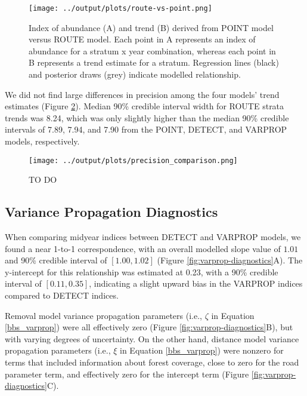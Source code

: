 \documentclass[12pt]{article}
\begin{document}
\begin{figure}[h]
	\texttt{[image: ../output/plots/route-vs-point.png]}
	\caption{Index of abundance (A) and trend (B) derived from POINT model versus ROUTE model. Each point in A represents an index of abundance for a stratum x year combination, whereas each point in B represents a trend estimate for a stratum. Regression lines (black) and posterior draws (grey) indicate modelled relationship.}
	\label{fig:route-vs-point}
\end{figure}

\par We did not find large differences in precision among the four models' trend estimates (Figure \ref{fig:precision}).
Median 90\% credible interval width for ROUTE strata trends was 8.24, which was only slightly higher than the median 90\% credible intervals of 7.89, 7.94, and 7.90 from the POINT, DETECT, and VARPROP models, respectively. 


\begin{figure}[h]
	\texttt{[image: ../output/plots/precision\_comparison.png]}
	\caption{TO DO}
	\label{fig:precision}
\end{figure}

\subsection{Variance Propagation Diagnostics}

\par When comparing midyear indices between DETECT and VARPROP models, we found a near 1-to-1 correspondence, with an overall modelled slope value of $1.01$ and 90\% credible interval of $[1.00, 1.02]$ (Figure \ref{fig:varprop-diagnostics}A).
The y-intercept for this relationship was estimated at 0.23, with a 90\% credible interval of $[0.11, 0.35]$, indicating a slight upward bias in the VARPROP indices compared to DETECT indices.

\par Removal model variance propagation parameters (i.e., $\zeta$ in Equation \ref{bbs_varprop}) were all effectively zero (Figure \ref{fig:varprop-diagnostics}B), but with varying degrees of uncertainty.
On the other hand, distance model variance propagation parameters (i.e., $\xi$ in Equation \ref{bbs_varprop}) were nonzero for terms that included information about forest coverage, close to zero for the road parameter term, and effectively zero for the intercept term (Figure \ref{fig:varprop-diagnostics}C).
\end{document}
